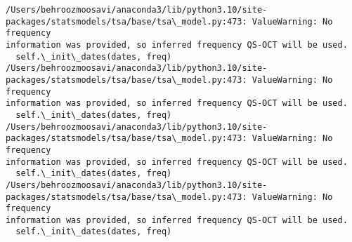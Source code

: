 \documentclass[11pt]{article}
\begin{document}
    \begin{Verbatim}[commandchars=\\\{\}]
/Users/behroozmoosavi/anaconda3/lib/python3.10/site-
packages/statsmodels/tsa/base/tsa\_model.py:473: ValueWarning: No frequency
information was provided, so inferred frequency QS-OCT will be used.
  self.\_init\_dates(dates, freq)
/Users/behroozmoosavi/anaconda3/lib/python3.10/site-
packages/statsmodels/tsa/base/tsa\_model.py:473: ValueWarning: No frequency
information was provided, so inferred frequency QS-OCT will be used.
  self.\_init\_dates(dates, freq)
/Users/behroozmoosavi/anaconda3/lib/python3.10/site-
packages/statsmodels/tsa/base/tsa\_model.py:473: ValueWarning: No frequency
information was provided, so inferred frequency QS-OCT will be used.
  self.\_init\_dates(dates, freq)
/Users/behroozmoosavi/anaconda3/lib/python3.10/site-
packages/statsmodels/tsa/base/tsa\_model.py:473: ValueWarning: No frequency
information was provided, so inferred frequency QS-OCT will be used.
  self.\_init\_dates(dates, freq)
    \end{Verbatim}

    \begin{center}
    \end{center}
    { \hspace*{\fill} \\}
    
\end{document}
